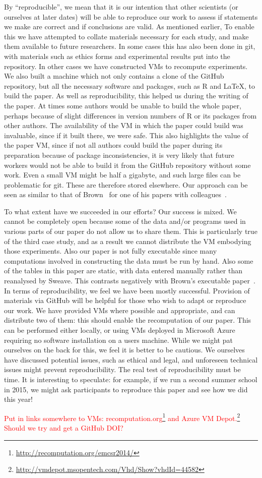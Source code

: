 By ``reproducible'', we mean that it is our intention that other scientists (or
ourselves at later dates) will be able to reproduce our work to assess if
statements we make are correct and if conclusions are valid.  
As mentioned earlier, 
To enable this we
have attempted to collate materials necessary for each study, and make them
available to future researchers.  
In some cases this has also been done in git,
with materials such as ethics forms and experimental results put into the repository.  
In other cases we have constructed VMs to recompute experiments.  
We also built a machine which not only contains a clone of the GitHub repository, but all the necessary software and packages, such as R and \LaTeX, to build the paper.
As well as reproducibility, this helped us during the writing of the paper.  At times some authors would be unable to build the whole paper, perhaps because of slight differences in version numbers of R or its packages from other authors.  The availability of the VM in which the paper could build was invaluable, since if it built there, we were safe.  This also highlights the value of the paper VM, since if not all authors could build the paper during its preparation because of package inconsistencies, it is very likely that future workers would not be able to build it from the GitHub repository without some work.
Even a small VM 
might be half a gigabyte, and such large files can be problematic for git.
These are therefore stored elsewhere.  
Our approach can be seen as similar to that of Brown~\cite{brown} for one of his papers with colleagues~\cite{Brown2012}.


To what extent have we succeeded in our efforts?
Our success is mixed.  We cannot be completely open because
some of the data and/or programs used in various parts of our paper do not allow us to share them.  This is particularly true of the third case study, and as a result we cannot distribute the VM embodying those experiments. Also our paper is not fully executable since 
many computations involved in constructing the data must be run by hand.  Also some of the tables in this paper are static, with data entered manually rather than reanalysed by Sweave. This contrasts negatively with Brown's executable paper~\cite{brown}.  
In terms of reproducibility, we feel we have been mostly successful.  
Provision of materials via GitHub will be helpful for those who wish to adapt or reproduce our work.
We have provided VMs where possible and appropriate, and can distribute two of them: this should enable the recomputation of our paper.  This can be performed either locally, or using VMs deployed in Microsoft Azure requiring no software installation on a users machine. 
While we might pat ourselves on the back for this, we feel it is better to be cautious. We ourselves have discussed potential issues, such as ethical and legal, and unforeseen technical issues might prevent reproducibility. The real test of reproducibility must be time.
It is interesting to speculate: for example, if we run a second summer school in 2015, we might ask participants to reproduce this paper and see how we did this year!

\textcolor{red}{Put in links somewhere to VMs: recomputation.org\footnote{\url{http://recomputation.org/emcsr2014/}} and Azure VM Depot.\footnote{\url{http://vmdepot.msopentech.com/Vhd/Show?vhdId=44582}} Should we try and get a GitHub DOI?}


